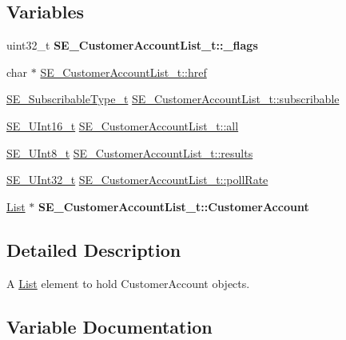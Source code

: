 \subsection*{Variables}
\begin{DoxyCompactItemize}
\item 
\mbox{\label{group__CustomerAccountList_ga10bbfe927f1d96b981b29a5c7bb7b93f}} 
uint32\+\_\+t {\bfseries S\+E\+\_\+\+Customer\+Account\+List\+\_\+t\+::\+\_\+flags}
\item 
char $\ast$ \hyperlink{group__CustomerAccountList_ga779dd7f5cc9226f54bb2c7c42171888e}{S\+E\+\_\+\+Customer\+Account\+List\+\_\+t\+::href}
\item 
\hyperlink{group__SubscribableType_ga5c41f553d369710ed34619266bf2551e}{S\+E\+\_\+\+Subscribable\+Type\+\_\+t} \hyperlink{group__CustomerAccountList_gaafec7bb1c828eb363b95a717027c419b}{S\+E\+\_\+\+Customer\+Account\+List\+\_\+t\+::subscribable}
\item 
\hyperlink{group__UInt16_gac68d541f189538bfd30cfaa712d20d29}{S\+E\+\_\+\+U\+Int16\+\_\+t} \hyperlink{group__CustomerAccountList_ga0257b81e21595473abdcc5596b175974}{S\+E\+\_\+\+Customer\+Account\+List\+\_\+t\+::all}
\item 
\hyperlink{group__UInt8_gaf7c365a1acfe204e3a67c16ed44572f5}{S\+E\+\_\+\+U\+Int8\+\_\+t} \hyperlink{group__CustomerAccountList_ga1e4789516b3787f1600934507472afe7}{S\+E\+\_\+\+Customer\+Account\+List\+\_\+t\+::results}
\item 
\hyperlink{group__UInt32_ga70bd4ecda3c0c85d20779d685a270cdb}{S\+E\+\_\+\+U\+Int32\+\_\+t} \hyperlink{group__CustomerAccountList_ga1ecc993e58dc2d5bb1e4ce5cb31b54e0}{S\+E\+\_\+\+Customer\+Account\+List\+\_\+t\+::poll\+Rate}
\item 
\mbox{\label{group__CustomerAccountList_ga39634539bc854d300d632ec32779711c}} 
\hyperlink{structList}{List} $\ast$ {\bfseries S\+E\+\_\+\+Customer\+Account\+List\+\_\+t\+::\+Customer\+Account}
\end{DoxyCompactItemize}


\subsection{Detailed Description}
A \hyperlink{structList}{List} element to hold Customer\+Account objects. 

\subsection{Variable Documentation}
\mbox{\label{group__CustomerAccountList_ga0257b81e21595473abdcc5596b175974}} 
